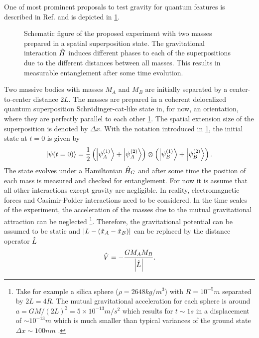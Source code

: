 One of most prominent proposals to test gravity for quantum features is described in Ref. \cite{Bose_2017} and is depicted in \cref{fig:2:simple-problem}.
\begin{figure}[!htbp]
  \centering
  \def\svgwidth{\textwidth}
  
  \caption{Schematic figure of the proposed experiment with two masses prepared in a spatial superposition state. The gravitational interaction $\hat{H}$ induces different phases to each of the superpositions due to the different distances between all masses. This results in measurable entanglement after some time evolution.}
  \label{fig:2:simple-problem}
\end{figure}
Two massive bodies with masses $M_A$ and $M_B$ are initially separated by a center-to-center distance $2L$. 
The masses are prepared in a coherent delocalized quantum superposition Schrödinger-cat-like state in, for now, an orientation, where they are perfectly parallel to each other \cref{fig:2:simple-problem}.
The spatial extension size of the superposition is denoted by $\Delta x$.
With the notation introduced in \cref{fig:2:simple-problem}, the initial state at $t=0$ is given by
\begin{equation}\label{eq:2:initial-state}
  \ket{\psi(t=0)} = \frac{1}{2}\left( \ket{\psi_A^{(1)}} + \ket{\psi_A^{(2)}} \right) \otimes \left( \ket{\psi_B^{(1)}} + \ket{\psi_B^{(2)}} \right) .
\end{equation}
The state evolves under a Hamiltonian $\hat{H}_G$ and after some time the position of each mass is measured and checked for entanglement.
For now it is assume that all other interactions except gravity are negligible. In reality, electromagnetic forces and Casimir-Polder interactions \cite{Casimir_1948, Casimir_1948a} need to be considered.
In the time scales of the experiment, the acceleration of the masses due to the mutual gravitational attraction can be neglected \footnote{Take for example a silica sphere ($\rho = 2648 \si{kg/m^3}$) with $R=10^{-5}\si{m}$ separated by $2L=4R$. The mutual gravitational acceleration for each sphere is around $a=GM/(2L)^2 = 5 \times 10^{-13}\si{m/s^2}$ which results for $t\sim 1 \si{s}$ in a displacement of $\sim 10^{-13}\si{m}$ which is much smaller than typical variances of the ground state $\Delta x \sim 100\si{nm}$ \cite{Fein_2019}.}.
Therefore, the gravitational potential can be assumed to be static and $\left\lvert L-(\hat{x}_A - \hat{x}_B)\right\rvert$ can be replaced by the distance operator $\hat{L}$
\begin{equation}\label{eq:2:newtonian-potential}
  \hat{V} = -\frac{G M_A M_B}{\left\lvert\hat{L}\right\rvert} .
\end{equation}
